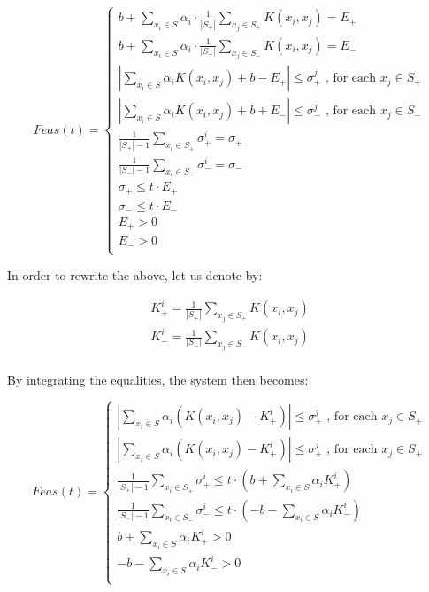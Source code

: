 \documentclass[a4paper,twoside,10pt]{report}
\begin{document}
	\[
		Feas(t) = \left\{
		\begin{array}{l}			
				b + \sum_{x_i\in S} {\alpha_i \cdot \frac{1}{|S_+|}\sum_{x_j\in S_+} {K(x_i, x_j)}} = E_+\\
				b + \sum_{x_i\in S} {\alpha_i \cdot \frac{1}{|S_-|}\sum_{x_j\in S_-} {K(x_i, x_j)}} = E_-\\
				
				|\sum_{x_i\in S} {\alpha_i K(x_i, x_j)} + b - E_+| \leq \sigma^j_+ \mbox{ , for each } x_j \in S_+\\
				|\sum_{x_i\in S} {\alpha_i K(x_i, x_j)} + b + E_-| \leq \sigma^j_- \mbox{ , for each } x_j \in S_-\\
					
				\frac{1}{|S_+| - 1} \sum_{x_i\in S_+} {\sigma_+^i} = {\sigma_+} \\
				\frac{1}{|S_-| - 1} \sum_{x_i\in S_-} {\sigma_-^i} = {\sigma_-} \\
				
				\sigma_+ \leq t \cdot E_+\\
				\sigma_- \leq t \cdot E_-\\
				E_+ > 0\\
				E_- > 0\\
		\end{array}
		\right. \label{feas_1}
	\]	
	
	In order to rewrite the above, let us denote by:
	
	\[
		\begin{array}{l}
			K^i_+ = \frac{1}{|S_+|}\sum_{x_j \in S_+} {K(x_i, x_j)} \\
			K^i_- = \frac{1}{|S_-|}\sum_{x_j \in S_-} {K(x_i, x_j)} \\
		\end{array}
	\]
	
	By integrating the equalities, the system then becomes:
	
	\[
		Feas(t) = \left\{
		\begin{array}{l}			
				|\sum_{x_i\in S} {\alpha_i (K(x_i, x_j) - K^i_+)}| \leq \sigma^j_+ \mbox{ , for each } x_j \in S_+\\
				|\sum_{x_i\in S} {\alpha_i (K(x_i, x_j) - K^i_+)}| \leq \sigma^j_+ \mbox{ , for each } x_j \in S_+\\								
				
				\frac{1}{|S_+| - 1} \sum_{x_i\in S_+} {\sigma_+^i} \leq t \cdot (b + \sum_{x_i\in S}{\alpha_i K^i_+})\\
				\frac{1}{|S_-| - 1} \sum_{x_i\in S_-} {\sigma_-^i} \leq t \cdot (-b - \sum_{x_i\in S}{\alpha_i K^i_-})\\
				b + \sum_{x_i\in S}{\alpha_i K^i_+} > 0\\
				- b - \sum_{x_i\in S}{\alpha_i K^i_-} > 0\\
		\end{array}
		\right. \label{feas_2}
	\]	
	
\end{document}
